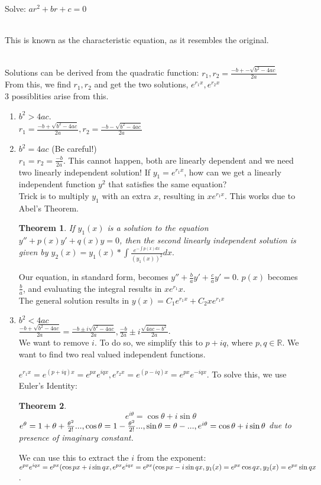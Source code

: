 \documentclass{article}
\newtheorem{theorem}{Theorem}
\begin{document}
Solve: $ar^2+br+c=0$
\begin{indent}
\\	This is known as the characteristic equation, as it resembles the original.
\end{indent}
\\Solutions can be derived from the quadratic function: $r_1, r_2=\frac{-b +- \sqrt{b^2-4ac}}{2a}$
	\\From this, we find $r_1, r_2$ and get the two solutions, $e^{r_1 x}, e^{r_2 x}$
\\3 possiblities arise from this.
\begin{enumerate}
	\item $b^2>4ac$.
		\\$r_1=\frac{-b + \sqrt{b^2-4ac}}{2a}, r_2=\frac{-b -\sqrt{b^2-4ac}}{2a}$
	\item $b^2=4ac$ (Be careful!)
		\\$r_1=r_2=\frac{-b}{2a}$. This cannot happen, both are linearly dependent and we need two linearly independent solution! If $y_1=e^{r_1 x}$, how can we get a linearly independent function $y^2$ that satisfies the same equation?
		\\Trick is to multiply $y_1$ with an extra $x$, resulting in $xe^{r_1 x}$. This works due to Abel's Theorem.
		\begin{theorem}
		If $y_1(x)$ is a solution to the equation $y''+p(x)y'+q(x)y=0$, then the second linearly independent solution is given by $y_2(x)=y_1(x)*\int{\frac{e^{-\int{p(x)dx}}}{(y_1(x))^2}dx}.$\end{theorem}
		Our equation, in standard form, becomes $y''+\frac{b}{a}y'+\frac{c}{a}y'=0$.
	$p(x)$ becomes $\frac{b}{a}$, and evaluating the integral results in $xe^{r_1}x$.
	\\The general solution results in $y(x)=C_1 e^{r_1 x}+C_2 xe^{r_1 x}$
	\item $b^2<4ac$
		\\$\frac{-b + \sqrt{b^2-4ac}}{2a}=\frac{-b \pm i\sqrt{b^2-4ac}}{2a}, 
		\frac{-b}{2a}\pm i \frac{\sqrt{4ac-b^2}}{2a}$.
		\\We want to remove $i$. 
		To do so, we simplify this to $p+iq$, where $p,q \in \mathbb{R}$. 
		We want to find two real valued independent functions.
		
		$e^{r_1 x}=e^{(p+iq)x}=e^{px}e^{iqx}, e^{r_2x}=e^{(p-iq)x}=e^{px}e^{-iqx}$.
		To solve this, we use Euler's Identity:
		\begin{theorem}
			\begin{equation}
				e^{i\theta}=\cos{\theta}+i \sin{\theta}
			\end{equation}
			$e^\theta=1+\theta+\frac{\theta^2}{2!}..., 
			\cos{\theta}=1-\frac{\theta^2}{2!}...,
			\sin{\theta}=\theta-..., 
			\\e^{i\theta}=\cos{\theta}+i \sin{\theta}$ 
			due to presence of imaginary constant.
		\end{theorem}
		We can use this to extract the $i$ from the exponent: 
		$e^{px}e^{iqx}=e^{px}(\cos{px}+i\sin{qx}, e^{px}e^{iqx}=e^{px}(\cos{px}-i\sin{qx}, 
		\\y_1(x)=e^{px}\cos{qx}, y_2(x)=e^{px}\sin{qx}$.
		

\end{enumerate}
\end{document}
